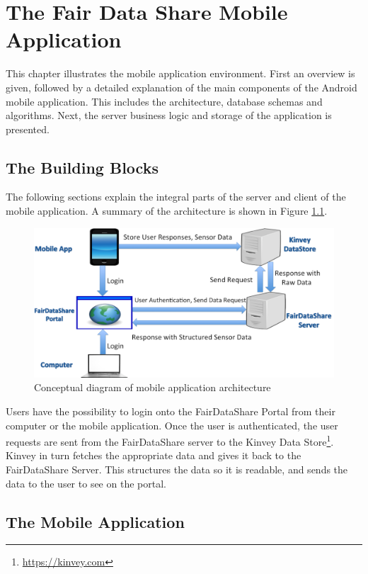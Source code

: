 \chapter{The Fair Data Share Mobile Application}
This chapter illustrates the mobile application environment. First an overview is given, followed by a detailed explanation of the main components of the Android mobile application. This includes the architecture, database schemas and algorithms. Next, the server business logic and storage of the application is presented.

\section{The Building Blocks}

The following sections explain the integral parts of the server and client of the mobile application. A summary of the architecture is shown
in Figure \ref{fig:bb}.

\begin{figure}[ht!]
\centering
\includegraphics[width=\textwidth,keepaspectratio]{./images/blocks_app2}
\caption{Conceptual diagram of mobile application architecture}
\label{fig:bb}
\end{figure}

Users have the possibility to login onto the FairDataShare Portal from their computer or the mobile application. Once the user is authenticated, the user requests
are sent from the FairDataShare server to the Kinvey Data Store\footnote{\url{https://kinvey.com}}. Kinvey in turn fetches the appropriate data and gives it back to the FairDataShare Server. This structures the data so it is readable, and sends the data to the user to see on the portal.

\section{The Mobile Application}

